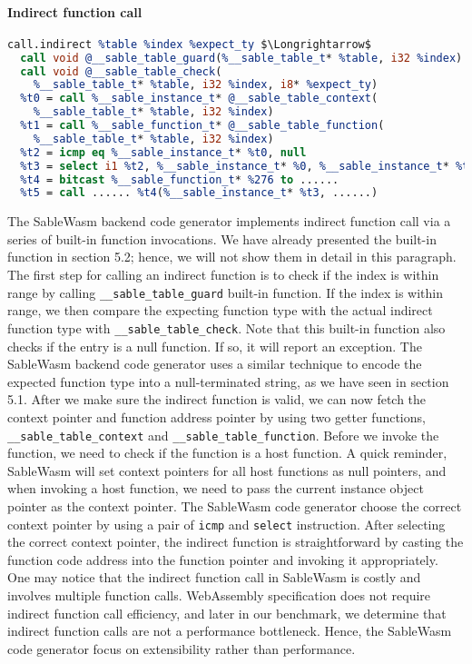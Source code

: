 \paragraph{Indirect function call} \quad
\begin{lstlisting}[basicstyle=\linespread{0.9}\small\ttfamily, language=LLVM, mathescape=true]
call.indirect %table %index %expect_ty $\Longrightarrow$ 
  call void @__sable_table_guard(%__sable_table_t* %table, i32 %index)
  call void @__sable_table_check(
    %__sable_table_t* %table, i32 %index, i8* %expect_ty)
  %t0 = call %__sable_instance_t* @__sable_table_context(
    %__sable_table_t* %table, i32 %index)
  %t1 = call %__sable_function_t* @__sable_table_function(
    %__sable_table_t* %table, i32 %index)
  %t2 = icmp eq %__sable_instance_t* %t0, null
  %t3 = select i1 %t2, %__sable_instance_t* %0, %__sable_instance_t* %t0
  %t4 = bitcast %__sable_function_t* %276 to ......
  %t5 = call ...... %t4(%__sable_instance_t* %t3, ......)
\end{lstlisting}
The SableWasm backend code generator implements indirect function call via a series of built-in function invocations. We have already presented the built-in function in section 5.2; hence, we will not show them in detail in this paragraph. The first step for calling an indirect function is to check if the index is within range by calling \texttt{\_\_sable\_table\_guard} built-in function. If the index is within range, we then compare the expecting function type with the actual indirect function type with \texttt{\_\_sable\_table\_check}. Note that this built-in function also checks if the entry is a null function. If so, it will report an exception. The SableWasm backend code generator uses a similar technique to encode the expected function type into a null-terminated string, as we have seen in section 5.1. After we make sure the indirect function is valid, we can now fetch the context pointer and function address pointer by using two getter functions, \texttt{\_\_sable\_table\_context} and \texttt{\_\_sable\_table\_function}. Before we invoke the function, we need to check if the function is a host function. A quick reminder, SableWasm will set context pointers for all host functions as null pointers, and when invoking a host function, we need to pass the current instance object pointer as the context pointer. The SableWasm code generator choose the correct context pointer by using a pair of \texttt{icmp} and \texttt{select} instruction. After selecting the correct context pointer, the indirect function is straightforward by casting the function code address into the function pointer and invoking it appropriately. One may notice that the indirect function call in SableWasm is costly and involves multiple function calls. WebAssembly specification does not require indirect function call efficiency, and later in our benchmark, we determine that indirect function calls are not a performance bottleneck. Hence, the SableWasm code generator focus on extensibility rather than performance.

